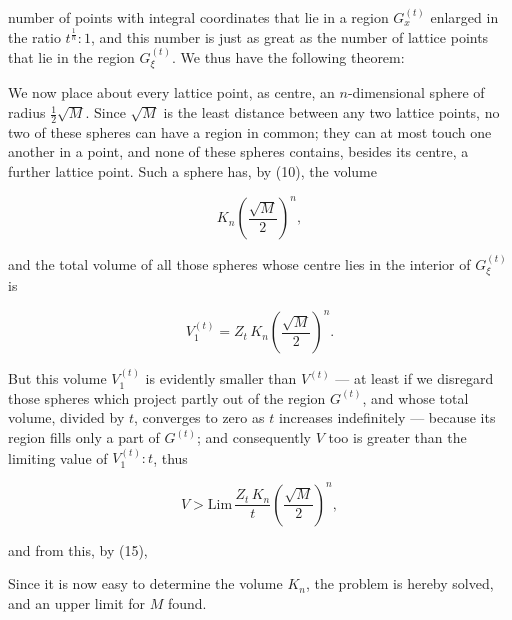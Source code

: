 number of points with integral coordinates that lie in a region
$G_x^{(t)}$ enlarged in the ratio $t^{\frac1n} : 1$, and this
number is just as great as the number of lattice points that lie
in the region $G_\xi^{(t)}$. We thus have the following theorem:



We now place about every lattice point, as centre, an
$n$-dimensional sphere of radius $\frac12\sqrt{M}$. Since $\sqrt{M}$
is the least distance between any two lattice points, no two of
these spheres can have a region in common; they can at most touch
one another in a point, and none of these spheres contains,
besides its centre, a further lattice point. Such a sphere
has, by (10), the volume

\[
K_n \left(\frac{\sqrt{M}}{2}\right)^{n},
\]

and the total volume of all those spheres whose centre lies in the
interior of $G_\xi^{(t)}$ is

\[
V_1^{(t)} = Z_t\, K_n \left(\frac{\sqrt{M}}{2}\right)^{n}.
\]

But this volume $V_1^{(t)}$ is evidently smaller than $V^{(t)}$ —
at least if we disregard those spheres which project partly out of
the region $G^{(t)}$, and whose total volume, divided by $t$,
converges to zero as $t$ increases indefinitely — because its
region fills only a part of $G^{(t)}$; and consequently $V$ too is
greater than the limiting value of $V_1^{(t)} : t$, thus

\[
V > \mathrm{Lim}\, \frac{Z_t\, K_n}{t} \left(\frac{\sqrt{M}}{2}\right)^{n},
\]

and from this, by (15),


Since it is now easy to determine the volume $K_n$, the problem is
hereby solved, and an upper limit for $M$ found.
